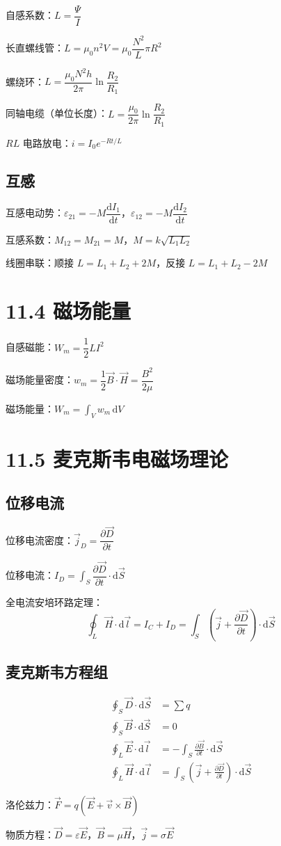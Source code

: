 \documentclass{ctexart}
\begin{document}
自感系数：$L = \dfrac{\Psi}{I}$

长直螺线管：$L = \mu_0 n^{2} V = \mu_0\dfrac{N^{2}}{L}\pi R^{2}$

螺绕环：$L = \dfrac{\mu_0 N^{2}h}{2\pi}\ln\dfrac{R_2}{R_1}$

同轴电缆（单位长度）：$L = \dfrac{\mu_0}{2\pi}\ln\dfrac{R_2}{R_1}$

$RL$ 电路放电：$i = I_0 e^{-Rt/L}$

\subsection*{互感}
互感电动势：$\varepsilon_{21} = -M\dfrac{\mathrm{d}I_1}{\mathrm{d}t}$，$\varepsilon_{12} = -M\dfrac{\mathrm{d}I_2}{\mathrm{d}t}$

互感系数：$M_{12} = M_{21} = M$，$M = k\sqrt{L_1 L_2}$

线圈串联：顺接 $L = L_1 + L_2 + 2M$，反接 $L = L_1 + L_2 - 2M$

\section*{11.4 磁场能量}

自感磁能：$W_m = \dfrac12 LI^{2}$

磁场能量密度：$w_m = \dfrac12 \vec{B}\cdot\vec{H} = \dfrac{B^{2}}{2\mu}$

磁场能量：$W_m = \displaystyle\int_V w_m\,\mathrm{d}V$

\section*{11.5 麦克斯韦电磁场理论}

\subsection*{位移电流}
位移电流密度：$\vec{j}_D = \dfrac{\partial\vec{D}}{\partial t}$

位移电流：$I_D = \displaystyle\int_S \dfrac{\partial\vec{D}}{\partial t}\cdot\mathrm{d}\vec{S}$

全电流安培环路定理：
\[
\oint_L \vec{H}\cdot\mathrm{d}\vec{l} = I_C + I_D = \int_S \left(\vec{j} + \frac{\partial\vec{D}}{\partial t}\right)\cdot\mathrm{d}\vec{S}
\]

\subsection*{麦克斯韦方程组}
\[
\begin{aligned}
\oint_S \vec{D}\cdot\mathrm{d}\vec{S} &= \sum q \\
\oint_S \vec{B}\cdot\mathrm{d}\vec{S} &= 0 \\
\oint_L \vec{E}\cdot\mathrm{d}\vec{l} &= -\int_S \frac{\partial\vec{B}}{\partial t}\cdot\mathrm{d}\vec{S} \\
\oint_L \vec{H}\cdot\mathrm{d}\vec{l} &= \int_S \left(\vec{j} + \frac{\partial\vec{D}}{\partial t}\right)\cdot\mathrm{d}\vec{S}
\end{aligned}
\]

洛伦兹力：$\vec{F} = q(\vec{E} + \vec{v}\times\vec{B})$

物质方程：$\vec{D} = \varepsilon\vec{E}$，$\vec{B} = \mu\vec{H}$，$\vec{j} = \sigma\vec{E}$
\end{document}
